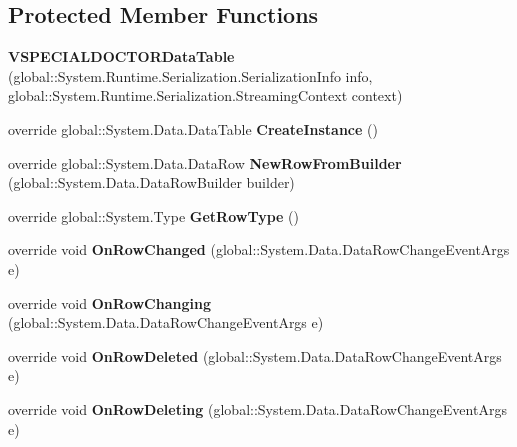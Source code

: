 \subsection*{Protected Member Functions}
\begin{CompactItemize}
\item 
\textbf{VSPECIALDOCTORDataTable} (global::System.Runtime.Serialization.SerializationInfo info, global::System.Runtime.Serialization.StreamingContext context)\label{class_automatic_medical_system_1_1_data_set1_1_1_v_s_p_e_c_i_a_l_d_o_c_t_o_r_data_table_af180359a350a5580e8d9cfafcc5c932}

\item 
override global::System.Data.DataTable \textbf{CreateInstance} ()\label{class_automatic_medical_system_1_1_data_set1_1_1_v_s_p_e_c_i_a_l_d_o_c_t_o_r_data_table_757b12db7adf50d6be33c8ec35b87668}

\item 
override global::System.Data.DataRow \textbf{NewRowFromBuilder} (global::System.Data.DataRowBuilder builder)\label{class_automatic_medical_system_1_1_data_set1_1_1_v_s_p_e_c_i_a_l_d_o_c_t_o_r_data_table_87d70020a8d39d451bacd08dc27d60ae}

\item 
override global::System.Type \textbf{GetRowType} ()\label{class_automatic_medical_system_1_1_data_set1_1_1_v_s_p_e_c_i_a_l_d_o_c_t_o_r_data_table_47c765428ce2b1a82c19a1bd6d3e383c}

\item 
override void \textbf{OnRowChanged} (global::System.Data.DataRowChangeEventArgs e)\label{class_automatic_medical_system_1_1_data_set1_1_1_v_s_p_e_c_i_a_l_d_o_c_t_o_r_data_table_99d1909efe169b3de3564629942c9007}

\item 
override void \textbf{OnRowChanging} (global::System.Data.DataRowChangeEventArgs e)\label{class_automatic_medical_system_1_1_data_set1_1_1_v_s_p_e_c_i_a_l_d_o_c_t_o_r_data_table_3cbf6f30315aed8aa89d67d7e13e3f95}

\item 
override void \textbf{OnRowDeleted} (global::System.Data.DataRowChangeEventArgs e)\label{class_automatic_medical_system_1_1_data_set1_1_1_v_s_p_e_c_i_a_l_d_o_c_t_o_r_data_table_92577911509519418e49ff1447aa6e68}

\item 
override void \textbf{OnRowDeleting} (global::System.Data.DataRowChangeEventArgs e)\label{class_automatic_medical_system_1_1_data_set1_1_1_v_s_p_e_c_i_a_l_d_o_c_t_o_r_data_table_d8e803697147b5b3f72fad0956737c54}

\end{CompactItemize}
